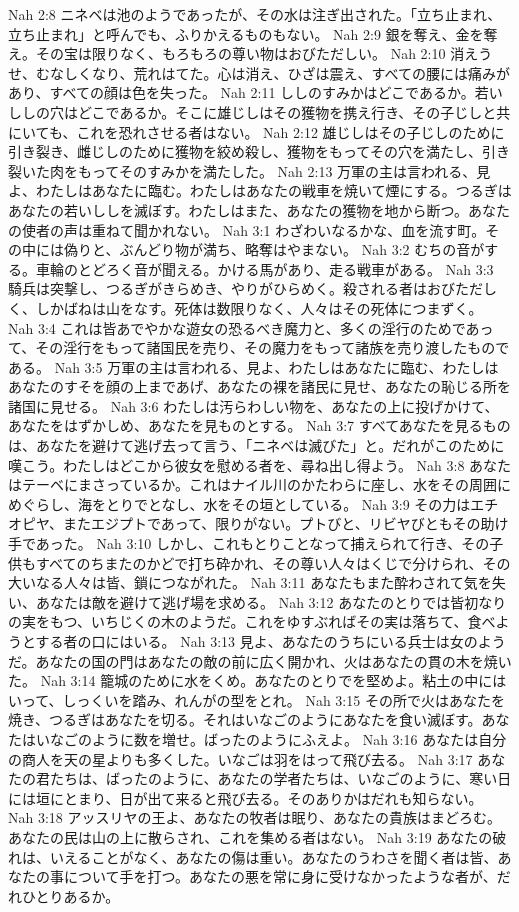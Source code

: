 Nah 2:8  ニネベは池のようであったが、その水は注ぎ出された。「立ち止まれ、立ち止まれ」と呼んでも、ふりかえるものもない。
Nah 2:9  銀を奪え、金を奪え。その宝は限りなく、もろもろの尊い物はおびただしい。
Nah 2:10  消えうせ、むなしくなり、荒れはてた。心は消え、ひざは震え、すべての腰には痛みがあり、すべての顔は色を失った。
Nah 2:11  ししのすみかはどこであるか。若いししの穴はどこであるか。そこに雄じしはその獲物を携え行き、その子じしと共にいても、これを恐れさせる者はない。
Nah 2:12  雄じしはその子じしのために引き裂き、雌じしのために獲物を絞め殺し、獲物をもってその穴を満たし、引き裂いた肉をもってそのすみかを満たした。
Nah 2:13  万軍の主は言われる、見よ、わたしはあなたに臨む。わたしはあなたの戦車を焼いて煙にする。つるぎはあなたの若いししを滅ぼす。わたしはまた、あなたの獲物を地から断つ。あなたの使者の声は重ねて聞かれない。
Nah 3:1  わざわいなるかな、血を流す町。その中には偽りと、ぶんどり物が満ち、略奪はやまない。
Nah 3:2  むちの音がする。車輪のとどろく音が聞える。かける馬があり、走る戦車がある。
Nah 3:3  騎兵は突撃し、つるぎがきらめき、やりがひらめく。殺される者はおびただしく、しかばねは山をなす。死体は数限りなく、人々はその死体につまずく。
Nah 3:4  これは皆あでやかな遊女の恐るべき魔力と、多くの淫行のためであって、その淫行をもって諸国民を売り、その魔力をもって諸族を売り渡したものである。
Nah 3:5  万軍の主は言われる、見よ、わたしはあなたに臨む、わたしはあなたのすそを顔の上まであげ、あなたの裸を諸民に見せ、あなたの恥じる所を諸国に見せる。
Nah 3:6  わたしは汚らわしい物を、あなたの上に投げかけて、あなたをはずかしめ、あなたを見ものとする。
Nah 3:7  すべてあなたを見るものは、あなたを避けて逃げ去って言う、「ニネベは滅びた」と。だれがこのために嘆こう。わたしはどこから彼女を慰める者を、尋ね出し得よう。
Nah 3:8  あなたはテーベにまさっているか。これはナイル川のかたわらに座し、水をその周囲にめぐらし、海をとりでとなし、水をその垣としている。
Nah 3:9  その力はエチオピヤ、またエジプトであって、限りがない。プトびと、リビヤびともその助け手であった。
Nah 3:10  しかし、これもとりことなって捕えられて行き、その子供もすべてのちまたのかどで打ち砕かれ、その尊い人々はくじで分けられ、その大いなる人々は皆、鎖につながれた。
Nah 3:11  あなたもまた酔わされて気を失い、あなたは敵を避けて逃げ場を求める。
Nah 3:12  あなたのとりでは皆初なりの実をもつ、いちじくの木のようだ。これをゆすぶればその実は落ちて、食べようとする者の口にはいる。
Nah 3:13  見よ、あなたのうちにいる兵士は女のようだ。あなたの国の門はあなたの敵の前に広く開かれ、火はあなたの貫の木を焼いた。
Nah 3:14  籠城のために水をくめ。あなたのとりでを堅めよ。粘土の中にはいって、しっくいを踏み、れんがの型をとれ。
Nah 3:15  その所で火はあなたを焼き、つるぎはあなたを切る。それはいなごのようにあなたを食い滅ぼす。あなたはいなごのように数を増せ。ばったのようにふえよ。
Nah 3:16  あなたは自分の商人を天の星よりも多くした。いなごは羽をはって飛び去る。
Nah 3:17  あなたの君たちは、ばったのように、あなたの学者たちは、いなごのように、寒い日には垣にとまり、日が出て来ると飛び去る。そのありかはだれも知らない。
Nah 3:18  アッスリヤの王よ、あなたの牧者は眠り、あなたの貴族はまどろむ。あなたの民は山の上に散らされ、これを集める者はない。
Nah 3:19  あなたの破れは、いえることがなく、あなたの傷は重い。あなたのうわさを聞く者は皆、あなたの事について手を打つ。あなたの悪を常に身に受けなかったような者が、だれひとりあるか。


